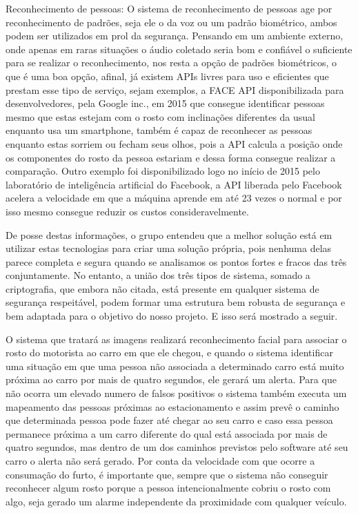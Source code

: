  \bullet Reconhecimento de pessoas: O sistema de reconhecimento de pessoas age por reconhecimento de padrões, seja ele o da voz ou um padrão biométrico, ambos podem ser utilizados em prol da segurança. Pensando em um ambiente externo, onde apenas em raras situações o áudio coletado seria bom e confiável o suficiente para se realizar o reconhecimento, nos resta a opção de padrões biométricos, o que é uma boa opção, afinal, já existem APIs livres para uso e eficientes que prestam esse tipo de serviço, sejam exemplos, a FACE API disponibilizada para desenvolvedores, pela Google inc., em 2015 que consegue identificar pessoas mesmo que estas estejam com o rosto com inclinações diferentes da usual enquanto usa um smartphone, também é capaz de reconhecer as pessoas enquanto estas sorriem ou fecham seus olhos, pois a API calcula a posição onde os componentes do rosto da pessoa estariam e dessa forma consegue realizar a comparação. Outro exemplo foi disponibilizado logo no início de 2015 pelo laboratório de inteligência artificial do Facebook, a API liberada pelo Facebook acelera a velocidade em que a máquina aprende em até 23 vezes o normal e por isso mesmo consegue reduzir os custos consideravelmente.


    De posse destas informações, o grupo entendeu que a melhor solução está em utilizar estas tecnologias para criar uma solução própria, pois nenhuma delas parece completa e segura quando se analisamos os pontos fortes e fracos das três conjuntamente. No entanto, a união dos três tipos de sistema, somado a criptografia, que embora não citada, está presente em qualquer sistema de segurança respeitável, podem formar uma estrutura bem robusta de segurança e bem adaptada para o objetivo do nosso projeto. E isso será mostrado a seguir.
    
    O sistema que tratará as imagens realizará reconhecimento facial para associar o rosto do motorista ao carro em que ele chegou, e quando o sistema identificar uma situação em que uma pessoa não associada a determinado carro está muito próxima ao carro por mais de quatro segundos, ele gerará um alerta. Para que não ocorra um elevado numero de falsos positivos o sistema também executa um  mapeamento das pessoas próximas ao estacionamento e assim prevê o caminho que determinada pessoa pode fazer até chegar ao seu carro e caso essa pessoa permanece próxima a um carro diferente do qual está associada por mais de quatro segundos, mas dentro de um dos caminhos previstos pelo software até seu carro o alerta não será gerado. Por conta da velocidade com que ocorre a consumação do furto, é importante que, sempre que o sistema não conseguir reconhecer algum rosto porque a pessoa intencionalmente cobriu o rosto com algo, seja gerado um alarme independente da proximidade com qualquer veículo.

